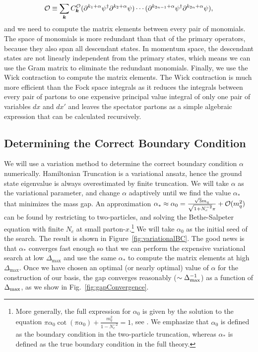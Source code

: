 \documentclass[12pt]{article}
\renewcommand{\d}{\partial}
\newcommand{\CO}{{\cal O}}
\newcommand\De\Delta
\newcommand{\Dmax}{\De_{\max}}
\newcommand{\kvec}{\boldsymbol{k}}
\newcommand{\Nc}{N_c}
\begin{document}
\begin{equation}
\CO \equiv \sum_{\kvec} C_{\kvec}^{\CO} (\d^{k_1+\alpha}\psi^\dagger\d^{k_2+\alpha}\psi)\cdots
(\d^{k_{2n-1}+\alpha}\psi^\dagger\d^{k_{2n}+\alpha}\psi),
\end{equation}
and we need to compute the matrix elements between every pair of monomials. 
The space of monomials is more redundant than that of the primary operators, because they also span all descendant states. In  momentum space, the descendant states are not linearly independent from the primary states, which means we can use the Gram matrix to eliminate the redundant monomials. 
Finally, we use the Wick contraction to compute the matrix elements. The Wick contraction is much more efficient than the Fock space integrals as it reduces the integrals between every pair of partons to
one expensive principal value integral of only one pair of variables $dx$ and $dx'$ and leaves the spectator partons as a simple algebraic expression that can be calculated recursively. 

\subsection{Determining the Correct Boundary Condition}


We will use a variation method to determine the correct boundary condition $\alpha$ numerically. Hamiltonian Truncation is a variational ansatz, hence the ground state eigenvalue is always overestimated by finite truncation. We will take $\alpha$ as the variational parameter, and change $\alpha$ adaptively until we find the value $\alpha_*$ that minimizes the mass gap. 
An approximation $\alpha_* \approx \alpha_0 = \frac{\sqrt{3}m_q}{\sqrt{1+\Nc^{-2}}\pi} + \CO(m_q^2)$ 
can be found \cite{Sugihara} by restricting to two-particles, and solving the Bethe-Salpeter equation with finite $\Nc$ at small parton-$x$.\footnote{More generally, the full expression for $\alpha_0$ is given by the solution to the equation $\pi \alpha_0 \cot ( \pi \alpha_0) + \frac{m_q^2}{1- N_c^{-2}} = 1$, see \cite{Sugihara}. We emphasize that $\alpha_0$ is defined as the boundary condition in the two-particle truncation, whereas $\alpha_*$ is defined as the true boundary condition in the full theory.} We will take $\alpha_0$ as the initial seed of the search. The result is shown in Figure~\ref{fig:variationalBC}. The good news is that $\alpha_*$ converges fast enough so that we can perform the expensive variational search at low $\Dmax$ and use the same $\alpha_*$ to compute the matrix elements at high $\Dmax$.  Once we have chosen an optimal (or nearly optimal) value of $\alpha$ for the construction of our basis, the gap converges reasonably ($\sim \Delta_{\rm max}^{-1}$) as a function of $\Delta_{\rm max}$, as we show in Fig.~\ref{fig:gapConvergence}.
\end{document}
